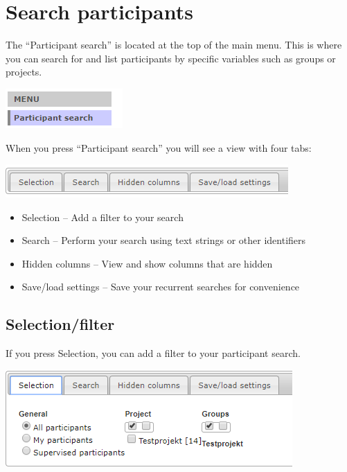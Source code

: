 \documentclass[]{book}
\providecommand{\tightlist}{%
  \setlength{\itemsep}{0pt}\setlength{\parskip}{0pt}}
\begin{document}
\hypertarget{search-participants}{%
\chapter{Search participants}\label{search-participants}}

The ``Participant search'' is located at the top of the main menu. This is where you can search for and list participants by specific variables such as groups or projects.

\includegraphics{images/search-participants-menu.png}

When you press ``Participant search'' you will see a view with four tabs:

\includegraphics{images/search-participants-tab.png}

\begin{itemize}
\tightlist
\item
  Selection -- Add a filter to your search
\item
  Search -- Perform your search using text strings or other identifiers
\item
  Hidden columns -- View and show columns that are hidden
\item
  Save/load settings -- Save your recurrent searches for convenience
\end{itemize}

\hypertarget{selectionfilter}{%
\section{Selection/filter}\label{selectionfilter}}

If you press Selection, you can add a filter to your participant search.

\includegraphics{images/selection-filter.png}
\end{document}
